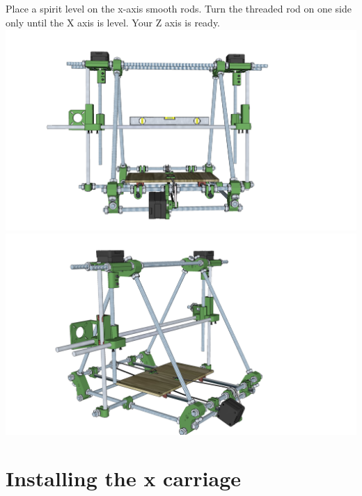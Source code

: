 \documentclass[twoside,openany,a4paper,titlepage]{memoir}
\begin{document}
	\section{}
	Place a spirit level on the x-axis smooth rods. Turn the threaded rod on one side only until the X axis is
	level. Your Z axis is ready.\\
	\includegraphics[width=1\linewidth]{graphics/ch8_24_1.png}
	\includegraphics[width=1\linewidth]{graphics/ch8_24_2.png}
	
	\chapter{Installing the x carriage}
\end{document}
